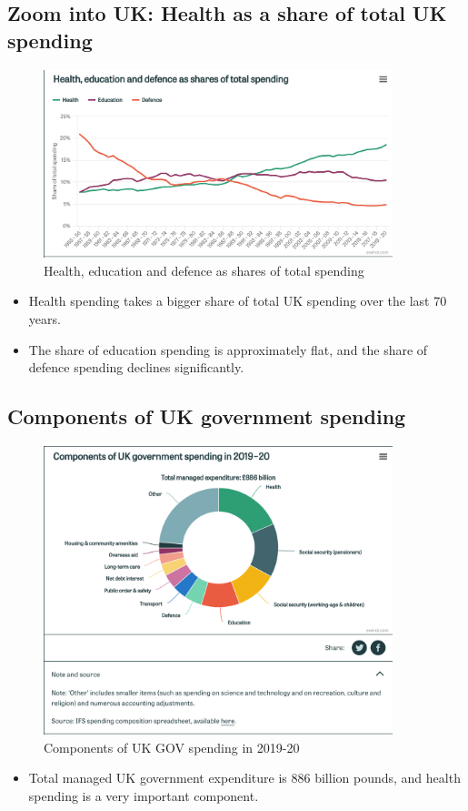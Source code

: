         \subsection{Zoom into UK: Health as a share of total UK spending}  
            \begin{figure}[H]%
                \centering
                \includegraphics[width=4in]{images/ch3/4.png}
                \caption{Health, education and defence as shares of total spending}
                \label{fig:label}
            \end{figure} 
\begin{itemize}           
        \item Health spending takes a bigger share of total UK spending over the last 70 years.
        \item The share of education spending is approximately flat, and the share of defence spending declines significantly.
        \end{itemize}
        
        \subsection{Components of UK government spending}  
            \begin{figure}[H]%
                \centering
                \includegraphics[width=4in]{images/ch3/5.png}
                \caption{Components of UK GOV spending in 2019-20}
                \label{fig:label}
            \end{figure} 
\begin{itemize}           
        \item Total managed UK government expenditure is 886 billion pounds, and health spending is a very important component.
        \end{itemize}

